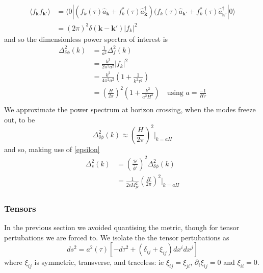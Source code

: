 \documentclass[a4paper,10pt]{article}
\renewcommand{\v}[1]{\mathbf{#1}}
\newcommand{\Mp}{M_{pl}}
\newcommand{\bphi}{\bar{\phi}}
\newcommand{\ann}[1]{\hat{a}_{\v{#1}}}
\newcommand{\cre}[1]{\hat{a}^\dagger_{\v{#1}}}
\newcommand{\fint}[1]{\int \frac{d^3 \v{#1}}{(2\pi)^3}}
\begin{document}
%
\begin{equation}
\begin{split}
\langle f_{\v{k}}f_{\v{k'}}\rangle &= \langle 0| (f_k(\tau)\ann{k}+f_k^*(\tau)\cre{k})(f_k(\tau)\ann{k'}+f_k^*(\tau)\cre{k'}|0\rangle \\
&= (2\pi)^3\delta(\v{k}-\v{k'})|f_k|^2
\end{split}
\end{equation}
and so the dimensionless power spectra of interest is  
\begin{equation}\begin{split}
\Delta^2_{\delta\phi}(k) &= \frac{1}{a^2}\Delta^2_f(k)\\
&= \frac{k^3}{2\pi^2a^2}|f_k|^2\\
&=\frac{k^2}{4\pi^2a^2}\left(1+\frac{1}{k^2\tau^2}\right)\\
&=\left(\frac{H}{2\pi}\right)^2\left(1+\frac{k^2}{a^2H^2}\right) \quad \text{using $a=\frac{-1}{H\tau}$}\\
\label{inflatonpower}
\end{split}\end{equation}
We approximate the power spectrum at horizon crossing, when the modes freeze out, to be
\begin{equation}
\Delta^2_{\delta\phi}(k) \approx (\frac{H}{2\pi})^2\rvert_{k=aH}
\end{equation}
and so, making use of \ref{epsilon}
\begin{equation}\begin{split}
\Delta^2_s(k) &=\left(\frac{\mathcal{H}}{\bphi'}\right)^2\Delta^2_{\delta\phi}(k)\\
&=\frac{1}{2\epsilon\Mp^2}\left(\frac{H}{2\pi}\right)^2\rvert_{k=aH}
\end{split}\end{equation}


\subsubsection{Tensors}

In the previous section we avoided quantising the metric, though for tensor pertubations we are forced to. We isolate the the tensor pertubations as 
\begin{equation}
ds^2 = a^2(\tau)[-d\tau^2 + (\delta_{ij}+\xi_{ij})dx^idx^j]
\end{equation}
where $\xi_{ij}$ is symmetric, transverse, and traceless: ie $\xi_{ij}=\xi_{ji}$, $\partial_i\xi_{ij}=0$ and $\xi_{ii}=0$.\\
\end{document}
